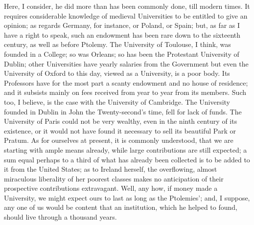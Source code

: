 Here, I consider, he did more than has been commonly done, till
modern times. It requires considerable knowledge of medieval
Universities to be entitled to give an opinion; as regards Germany,
for instance, or Poland, or Spain; but, as far as I have a right to
speak, such an endowment has been rare down to the sixteenth century,
as well as before Ptolemy. The University of Toulouse, I think, was
founded in a College; so was Orleans; so has been the Protestant
University of Dublin; other Universities have yearly salaries from the
Government but even the University of Oxford to this day, viewed as
a University, is a poor body. Its Professors have for the most
part a scanty endowment and no house of residence; and it subsists
mainly on fees received from year to year from its members. Such too,
I believe, is the case with the University of Cambridge. The
University founded in Dublin in John the Twenty-second's time, fell
for lack of funds. The University of Paris could not be very wealthy,
even in the ninth century of its existence, or it would not have found
it necessary to sell its beautiful Park or Pratum. As for ourselves at
present, it is commonly understood, that we are starting with ample
means already, while large contributions are still expected; a sum
equal perhaps to a third of what has already been collected is to be
added to it from the United States; as to Ireland herself, the
overflowing, almost miraculous liberality of her poorest classes makes
no anticipation of their prospective contributions extravagant. Well,
any how, if money made a University, we might expect ours to last as
long as the Ptolemies'; and, I suppose, any one of us would be content
that an institution, which he helped to found, should live through a
thousand years.


